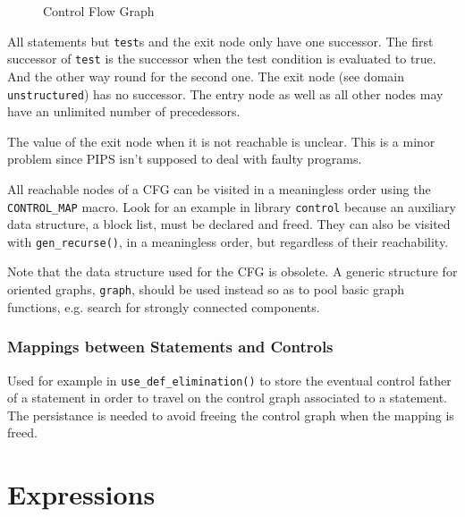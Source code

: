 \begin{figure}
\begin{center}
\mbox{}
\end{center}
\caption{Control Flow Graph}
\label{figure-unstructured}
\end{figure}

All statements but \verb/test/s and the exit node only have one
successor. The first successor of \verb/test/ is the successor when the
test condition is evaluated to true.  And the other way round for the
second one. The exit node (see domain \verb/unstructured/) has no
successor. The entry node as well as all other nodes may have an
unlimited number of precedessors.

The value of the exit node when it is not reachable is unclear. This is
a minor problem since PIPS isn't supposed to deal with faulty programs.

All reachable nodes of a CFG can be visited in a meaningless order using the
\verb/CONTROL_MAP/ macro. Look for an example in library \verb/control/
because an auxiliary data structure, a block list, must be declared and
freed. They can also be visited with \verb/gen_recurse()/, in a
meaningless order, but regardless of their reachability.

Note that the data structure used for the CFG is obsolete. A generic
structure for oriented graphs, \verb/graph/, should be used instead so
as to pool basic graph functions, e.g. search for strongly connected
components.

\subsubsection{Mappings between Statements and Controls}

{}

{}

Used for example in \verb/use_def_elimination()/ to store the eventual
control father of a statement in order to travel on the control graph
associated to a statement. The persistance is needed to avoid freeing
the control graph when the mapping is freed.

\section{Expressions}
\label{expression}

